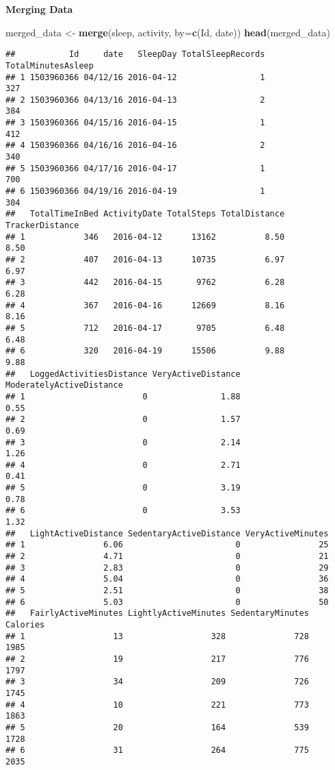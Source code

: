 \documentclass[
]{article}
\newenvironment{Shaded}{\begin{snugshade}}{\end{snugshade}}
\newcommand{\AttributeTok}[1]{\textcolor[rgb]{0.13,0.29,0.53}{#1}}
\newcommand{\FunctionTok}[1]{\textcolor[rgb]{0.13,0.29,0.53}{\textbf{#1}}}
\newcommand{\NormalTok}[1]{#1}
\newcommand{\OtherTok}[1]{\textcolor[rgb]{0.56,0.35,0.01}{#1}}
\newcommand{\StringTok}[1]{\textcolor[rgb]{0.31,0.60,0.02}{#1}}
\begin{document}
\textbf{Merging Data}

\begin{Shaded}
\begin{Highlighting}[]
\NormalTok{merged\_data }\OtherTok{\textless{}{-}} \FunctionTok{merge}\NormalTok{(sleep, activity, }\AttributeTok{by=}\FunctionTok{c}\NormalTok{(}\StringTok{\textquotesingle{}Id\textquotesingle{}}\NormalTok{, }\StringTok{\textquotesingle{}date\textquotesingle{}}\NormalTok{))}
\FunctionTok{head}\NormalTok{(merged\_data)}
\end{Highlighting}
\end{Shaded}

\begin{verbatim}
##           Id     date   SleepDay TotalSleepRecords TotalMinutesAsleep
## 1 1503960366 04/12/16 2016-04-12                 1                327
## 2 1503960366 04/13/16 2016-04-13                 2                384
## 3 1503960366 04/15/16 2016-04-15                 1                412
## 4 1503960366 04/16/16 2016-04-16                 2                340
## 5 1503960366 04/17/16 2016-04-17                 1                700
## 6 1503960366 04/19/16 2016-04-19                 1                304
##   TotalTimeInBed ActivityDate TotalSteps TotalDistance TrackerDistance
## 1            346   2016-04-12      13162          8.50            8.50
## 2            407   2016-04-13      10735          6.97            6.97
## 3            442   2016-04-15       9762          6.28            6.28
## 4            367   2016-04-16      12669          8.16            8.16
## 5            712   2016-04-17       9705          6.48            6.48
## 6            320   2016-04-19      15506          9.88            9.88
##   LoggedActivitiesDistance VeryActiveDistance ModeratelyActiveDistance
## 1                        0               1.88                     0.55
## 2                        0               1.57                     0.69
## 3                        0               2.14                     1.26
## 4                        0               2.71                     0.41
## 5                        0               3.19                     0.78
## 6                        0               3.53                     1.32
##   LightActiveDistance SedentaryActiveDistance VeryActiveMinutes
## 1                6.06                       0                25
## 2                4.71                       0                21
## 3                2.83                       0                29
## 4                5.04                       0                36
## 5                2.51                       0                38
## 6                5.03                       0                50
##   FairlyActiveMinutes LightlyActiveMinutes SedentaryMinutes Calories
## 1                  13                  328              728     1985
## 2                  19                  217              776     1797
## 3                  34                  209              726     1745
## 4                  10                  221              773     1863
## 5                  20                  164              539     1728
## 6                  31                  264              775     2035
\end{verbatim}
\end{document}
